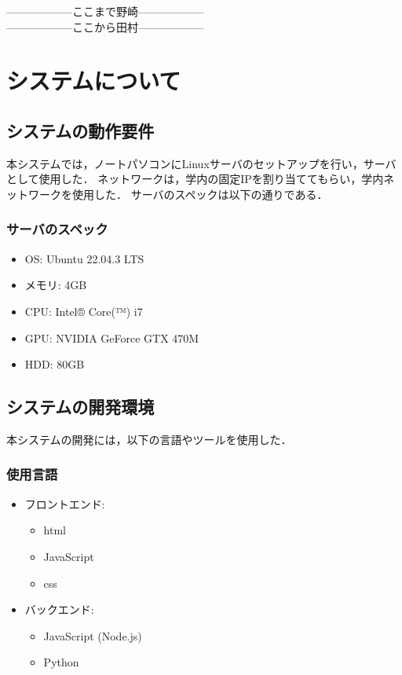\begin{multicols*}{2}
------------------ここまで野崎------------------\\
------------------ここから田村------------------\\
\section{システムについて} 

\subsection{システムの動作要件} 本システムでは，ノートパソコンにLinuxサーバのセットアップを行い，サーバとして使用した． ネットワークは，学内の固定IPを割り当ててもらい，学内ネットワークを使用した． 
サーバのスペックは以下の通りである．
\subsubsection{サーバのスペック} 
\begin{itemize} 
	\item OS: Ubuntu 22.04.3 LTS 
	\item メモリ: 4GB 
	\item CPU: Intel® Core(™) i7 
	\item GPU: NVIDIA GeForce GTX 470M \item HDD: 80GB 
\end{itemize}
\subsection{システムの開発環境} 本システムの開発には，以下の言語やツールを使用した．
\subsubsection{使用言語} 
\begin{itemize} 
	\item フロントエンド: 
	\begin{itemize} 
		\item html 
		\item JavaScript 
		\item css 
	\end{itemize} 
	\item バックエンド: 
	\begin{itemize} 
		\item JavaScript (Node.js) 
		\item Python 
	\end{itemize} 
\end{itemize}

\end{multicols*}
